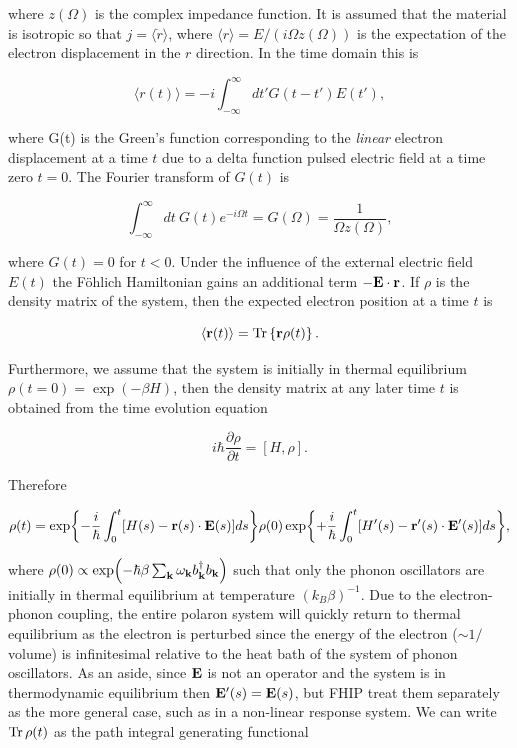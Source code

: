 where $z(\Omega)$ is the complex impedance function. It is assumed that the material is isotropic so that $j = \langle \dot{r} \rangle$, where $\langle r \rangle = E / (i\Omega z(\Omega))$ is the expectation of the electron displacement in the $r$ direction. In the time domain this is

\begin{equation}
    \langle r(t) \rangle = -i \int^\infty_{-\infty} dt' G(t - t') E(t') ,
\end{equation}

where G(t) is the Green's function corresponding to the \emph{linear} electron displacement at a time $t$ due to a delta function pulsed electric field at a time zero $t = 0$. The Fourier transform of $G(t)$ is

\begin{equation}
    \int^\infty_{-\infty} dt\ G(t) e^{-i\Omega t} = G(\Omega) = \frac{1}{\Omega z(\Omega)},
\end{equation}

where $G(t) = 0$ for $t < 0$. Under the influence of the external electric field $E(t)$ the F\"ohlich Hamiltonian gains an additional term $- \vb{E} \cdot \vb{r}$. If $\rho$ is the density matrix of the system, then the expected electron position at a time $t$ is

\begin{equation}
    \langle \vb{r}(t) \rangle = \Tr \left\{ \vb{r} \rho(t) \right\}.
\end{equation}

Furthermore, we assume that the system is initially in thermal equilibrium $\rho(t = 0) = \exp(-\beta H)$, then the density matrix at any later time $t$ is obtained from the time evolution equation

\begin{equation}
    i\hbar \frac{\partial \rho}{\partial t} = [H, \rho].
\end{equation}

Therefore

\begin{equation}
    \rho(t) = \exp{-\frac{i}{\hbar}\int^{t}_0 [H(s)- \vb{r}(s)\cdot\vb{E}(s)] ds} \rho(0) \exp{+\frac{i}{\hbar}\int^t_0 [H'(s) - \vb{r'}(s)\cdot\vb{E'}(s)] ds},
\end{equation}

where $\rho(0) \propto \exp(-\hbar \beta \sum_{\vb{k}} \omega_{\vb{k}} b^\dagger_{\vb{k}} b_{\vb{k}})$ such that only the phonon oscillators are initially in thermal equilibrium at temperature $(k_B \beta)^{-1}$. Due to the electron-phonon coupling, the entire polaron system will quickly return to thermal equilibrium as the electron is perturbed since the energy of the electron ($\sim 1/$volume) is infinitesimal relative to the heat bath of the system of phonon oscillators. As an aside, since $\vb{E}$ is not an operator and the system is in thermodynamic equilibrium then $\vb{E'}(s) = \vb{E}(s)$, but FHIP treat them separately as the more general case, such as in a non-linear response system. We can write $\Tr \rho(t)$ as the path integral generating functional

